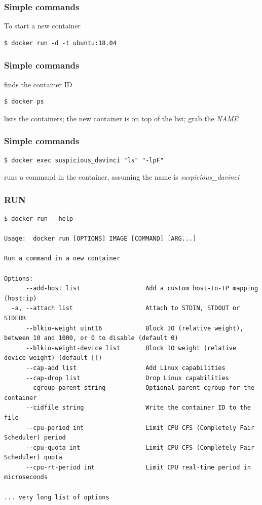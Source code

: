 
\begin{frame}[fragile]
\frametitle{Simple commands}

To start a new container

\begin{lstlisting}
$ docker run -d -t ubuntu:18.04
\end{lstlisting}

\end{frame}

\begin{frame}[fragile]
\frametitle{Simple commands}

finds the container ID
\begin{lstlisting}
$ docker ps
\end{lstlisting}
lists the containers; the new container is on top of the list; grab the \textit{NAME}
\end{frame}

\begin{frame}[fragile]
\frametitle{Simple commands}

\begin{lstlisting}
$ docker exec suspicious_davinci "ls" "-lpF"
\end{lstlisting}
runs a command in the container, assuming the name is \textit{suspicious\_davinci}
\end{frame}

\begin{frame}[fragile]
\frametitle{RUN}
\scriptsize
\begin{lstlisting}[breaklines=true]
$ docker run --help

Usage:  docker run [OPTIONS] IMAGE [COMMAND] [ARG...]

Run a command in a new container

Options:
      --add-host list                  Add a custom host-to-IP mapping (host:ip)
  -a, --attach list                    Attach to STDIN, STDOUT or STDERR
      --blkio-weight uint16            Block IO (relative weight), between 10 and 1000, or 0 to disable (default 0)
      --blkio-weight-device list       Block IO weight (relative device weight) (default [])
      --cap-add list                   Add Linux capabilities
      --cap-drop list                  Drop Linux capabilities
      --cgroup-parent string           Optional parent cgroup for the container
      --cidfile string                 Write the container ID to the file
      --cpu-period int                 Limit CPU CFS (Completely Fair Scheduler) period
      --cpu-quota int                  Limit CPU CFS (Completely Fair Scheduler) quota
      --cpu-rt-period int              Limit CPU real-time period in microseconds

... very long list of options
\end{lstlisting}
\normalsize
\end{frame}

